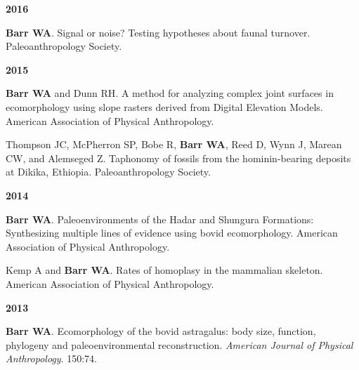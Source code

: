 \documentclass{article}
\begin{document}
\begin{description*}
\begin{minipage}{\linewidth}
\item[] {\bfseries 2016}
\item[] {\bfseries Barr WA}. Signal or noise? Testing hypotheses about faunal turnover. Paleoanthropology Society. 
\end{minipage}
\end{description*}



\begin{description*}
\begin{minipage}{\linewidth}
\item[] {\bfseries 2015}
\item[] {\bfseries Barr WA} and Dunn RH. A method for analyzing complex joint surfaces in ecomorphology using slope rasters derived from Digital Elevation Models. American Association of Physical Anthropology.
\item[] Thompson JC, McPherron SP, Bobe R, {\bfseries Barr WA}, Reed D, Wynn J, Marean CW, and Alemseged Z. Taphonomy of fossils from the hominin-bearing deposits at Dikika, Ethiopia. Paleoanthropology Society.
\end{minipage}
\end{description*}



\begin{description*}
\begin{minipage}{\linewidth}
\item[] {\bfseries 2014}
\item[] {\bfseries Barr WA}. Paleoenvironments of the Hadar and Shungura Formations: Synthesizing multiple lines of evidence using bovid ecomorphology. American Association of Physical Anthropology.
\item[] Kemp A and {\bfseries Barr WA}. Rates of homoplasy in the mammalian skeleton. American Association of Physical Anthropology.
\end{minipage}
\end{description*}



\begin{description*}
\begin{minipage}{\linewidth}
\item[] {\bfseries 2013}
\item[] {\bfseries Barr WA}. Ecomorphology of the bovid astragalus: body size, function, phylogeny and paleoenvironmental reconstruction. \emph{American Journal of Physical Anthropology}. 150:74.
\end{minipage}
\end{description*}
\end{document}
